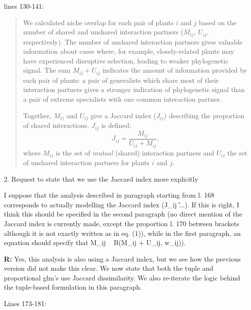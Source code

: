 \documentclass[12pt]{letter}
\newenvironment{refquote}{\bigskip \begin{it}}{\end{it}\smallskip}
\begin{document}
		lines 130-141:


		\begin{quotation}

			We calculated niche overlap for each pair of plants $i$ and $j$ based on the number of shared and unshared interaction partners ($M_{ij}$, $U_{ij}$, respectively). 
			The number of unshared interaction 
			partners gives valuable information about cases where, for example, 
			closely-related plants may have experienced disruptive selection, leading to weaker phylogenetic signal. 
			The sum $M_{ij} + U_{ij}$ indicates the amount of information  provided by each pair of plants: a pair of generalists which share most of their interaction partners gives a stronger indication of phylogenetic signal than a pair of extreme specialists with one common interaction partner.


			Together, $M_{ij}$ and $U_{ij}$ give a Jaccard index ($J_{ij}$) describing 
			the proportion of shared interactions. $J_{ij}$ is defined: 
			\begin{equation}
			J_{ij} = \frac{M_{ij}}{U_{ij}+M_{ij}} ,
			\end{equation}
			where $M_{ij}$ is the set of \emph{mutual} (shared) interaction partners and $U_{ij}$ the set of unshared interaction partners for plants $i$ and $j$.

		\end{quotation} 


	2. Request to state that we use the Jaccard index more explicitly 


		\begin{refquote}
			I suppose that the analysis described in paragraph starting from l. 168 corresponds to actually modelling the Jaccard index (J\_ij \~ ...). If this is right, I think this should be specified in the second paragraph (no direct mention of the Jaccard index is currently made, except the proportion l. 170 between brackets although it is not exactly written as in eq. (1)), while in the first paragraph, an equation should specify that M\_ij ~ B(M\_ij + U\_ij, w\_ij)).
		\end{refquote}


		\textbf{R:} Yes, this analysis is also using a Jaccard index, but we see how the previous version did not make this clear. We now state that both the tuple and proportional glm's use Jaccard dissimilarity. We also re-iterate the logic behind the tuple-based formulation in this paragraph.


			Lines 173-181:
\end{document}
